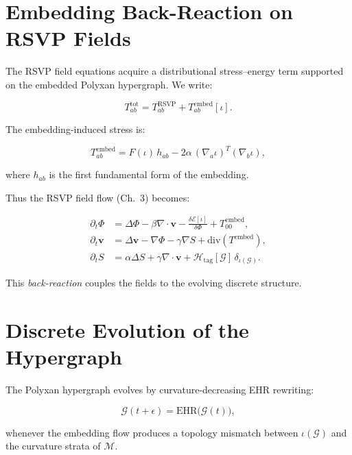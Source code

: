 \section{Embedding Back-Reaction on RSVP Fields}

The RSVP field equations acquire a distributional stress–energy term
supported on the embedded Polyxan hypergraph.  
We write:

\begin{equation}
T^{\mathrm{tot}}_{ab}
 = T^{\mathrm{RSVP}}_{ab}
   + T^{\mathrm{embed}}_{ab}[\iota].
\end{equation}

The embedding-induced stress is:

\begin{equation}
\label{eq:embedding-stress-expanded}
T_{ab}^{\mathrm{embed}}
 = F(\iota)\,h_{ab} - 2\alpha\,(\nabla_a\iota)^T(\nabla_b\iota),
\end{equation}

where $h_{ab}$ is the first fundamental form of the embedding.

Thus the RSVP field flow (Ch.~3) becomes:

\begin{align}
\partial_t\Phi
  &= \Delta\Phi - \beta\nabla\cdot\mathbf{v}
     - \frac{\delta\mathcal{E}[\iota]}{\delta\Phi}
     + T_{00}^{\mathrm{embed}}, \\[4pt]
\partial_t\mathbf{v}
  &= \Delta\mathbf{v} - \nabla\Phi - \gamma\nabla S
     + \mathrm{div}(T^{\mathrm{embed}}), \\[4pt]
\partial_t S
  &= \alpha\Delta S
     + \gamma\nabla\cdot\mathbf{v}
     + \mathcal{H}_{\mathrm{tag}}[\mathcal{G}]\,\delta_{\iota(\mathcal{G})}.
\end{align}

This \emph{back-reaction} couples the fields to the evolving discrete
structure.

\section{Discrete Evolution of the Hypergraph}

The Polyxan hypergraph evolves by curvature-decreasing EHR rewriting:

\begin{equation}
\mathcal{G}(t+\epsilon)
  = \mathrm{EHR}\big(\mathcal{G}(t)\big),
\end{equation}

whenever the embedding flow produces a topology mismatch between
$\iota(\mathcal{G})$ and the curvature strata of $\mathcal{M}$.

